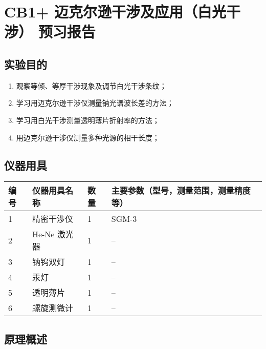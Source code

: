 \documentclass[dvipsnames, svgnames,a4paper,11pt]{article}
\begin{document}
\clearpage
\tableofcontents
\clearpage

\setcounter{section}{0}
\section{CB1+ \quad 迈克尔逊干涉及应用（白光干涉） \quad\heiti 预习报告}
	
\subsection{实验目的}
\begin{enumerate}
	\item 观察等倾、等厚干涉现象及调节白光干涉条纹；
	\item 学习用迈克尔逊干涉仪测量钠光谱波长差的方法；
	\item 学习用白光干涉测量透明薄片折射率的方法；
	\item 用迈克尔逊干涉仪测量多种光源的相干长度；
	
\end{enumerate}

\subsection{仪器用具}
	\begin{table}[htbp]
		\centering
		\renewcommand\arraystretch{1.6}
		\begin{tabular}{p{}|p{}|p{}|p{}}
			\hline
			编号& 仪器用具名称 & 数量 &  主要参数（型号，测量范围，测量精度等） \\
			\hline
			1& 精密干涉仪 & 1 & SGM-3 \\
			
			2& He-Ne 激光器 & 1 & -- \\
			
			3& 钠钨双灯 & 1 & -- \\
			
			4& 汞灯 & 1 & -- \\
			
			5& 透明薄片 & 1 & -- \\
			
			6& 螺旋测微计 & 1 & -- \\
			\hline
		\end{tabular}
	\end{table}

\subsection{原理概述}
\end{document}

